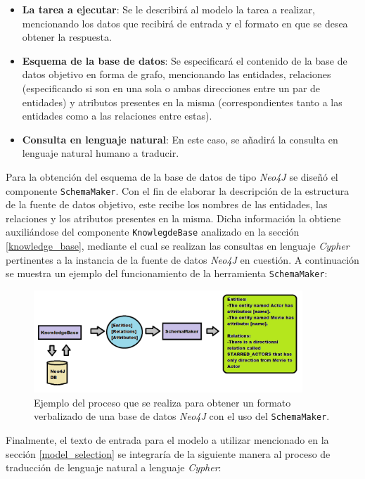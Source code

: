 \begin{itemize}
	\item \textbf{La tarea a ejecutar}: Se le describirá al modelo la tarea a realizar, mencionando los datos que recibirá de entrada y el formato en que se desea obtener la respuesta.
	\item \textbf{Esquema de la base de datos}: Se especificará el contenido de la base de datos objetivo en forma de grafo, mencionando las entidades, relaciones (especificando si son en una sola o ambas direcciones entre un par de entidades) y atributos presentes en la misma (correspondientes tanto a las entidades como a las relaciones entre estas).
	\item \textbf{Consulta en lenguaje natural}: En este caso, se añadirá la consulta en lenguaje natural humano a traducir.
\end{itemize}

Para la obtención del esquema de la base de datos de tipo \textit{Neo4J} se diseñó el componente \texttt{SchemaMaker}. Con el fin de elaborar la descripción de la estructura de la fuente de datos objetivo, este recibe los nombres de las entidades, las relaciones y los atributos presentes en la misma. Dicha información la obtiene auxiliándose del componente \texttt{KnowlegdeBase} analizado en la sección \ref{knowledge_base}, mediante el cual se realizan las consultas en lenguaje \textit{Cypher} pertinentes a la instancia de la fuente de datos \textit{Neo4J} en cuestión. A continuación se muestra un ejemplo del funcionamiento de la herramienta \texttt{SchemaMaker}:

\begin{figure}[H]\label{schemamaker}
	\centering
	\includegraphics[width = 0.9\textwidth]{./Graphics/schemamaker}
	\caption{Ejemplo del proceso que se realiza para obtener un formato verbalizado de una base de datos \textit{Neo4J} con el uso del \texttt{SchemaMaker}.}
\end{figure}

Finalmente, el texto de entrada para el modelo a utilizar mencionado en la sección \ref{model_selection} se integraría de la siguiente manera al proceso de traducción de lenguaje natural a lenguaje \textit{Cypher}:

